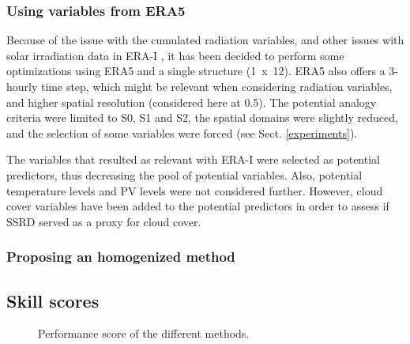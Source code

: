 \documentclass[draft]{agujournal2019}
\begin{document}
\subsubsection{Using variables from ERA5}

Because of the issue with the cumulated radiation variables, and other issues with solar irradiation data in ERA-I \cite{Boilley2015}, it has been decided to perform some optimizations using ERA5 and a single structure (1~x~12). ERA5 also offers a 3-hourly time step, which might be relevant when considering radiation variables, and higher spatial resolution (considered here at 0.5\degree). The potential analogy criteria were limited to S0, S1 and S2, the spatial domains were slightly reduced, and the selection of some variables were forced (see Sect. \ref{experiments}).

The variables that resulted as relevant with ERA-I were selected as potential predictors, thus decreasing the pool of potential variables. Also, potential temperature levels and PV levels were not considered further. However, cloud cover variables have been added to the potential predictors in order to assess if SSRD served as a proxy for cloud cover.





\subsubsection{Proposing an homogenized method}




\subsection{Skill scores}
\label{skill_score}


\begin{figure}[hbt]
	\noindent{}
	\caption{Performance score of the different methods.}
	\label{fig_scores}
\end{figure}
\end{document}
